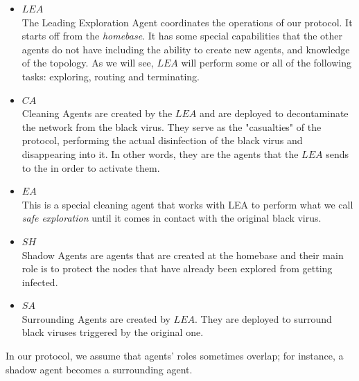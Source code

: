 \begin{itemize}
\item  $LEA$ \\
The Leading Exploration Agent coordinates the operations of our protocol. It starts off from the {\em homebase}. It has some special  capabilities that the other agents do not have including the ability to create new agents, and knowledge of the topology. As we will see, $LEA$ will perform some or all of the following tasks: exploring, routing and terminating.

\item $CA$ \\
Cleaning Agents are created by the $LEA$ and are deployed to decontaminate the network from the black virus.
They serve as the "casualties" of the protocol, performing the actual  disinfection of the black virus and disappearing into it. In other words, they are the agents that the $LEA$ sends to the \bvs in order to  activate them. 
 
\item $EA$ \\ 
This is  a special cleaning agent  that works with  LEA   to perform what we call  {\em safe exploration} until it comes in contact with the original black virus.  

\item $SH$ \\
Shadow Agents are agents that are created at the homebase and their main role is to protect  the
nodes that have already been explored from getting infected. 



\item $SA$ \\
Surrounding Agents are created by  $LEA$. 
They are deployed to surround  black viruses triggered by the original one.


\end{itemize}
In our protocol, we assume that  agents' roles sometimes overlap; for instance, a shadow agent becomes a surrounding agent. 



